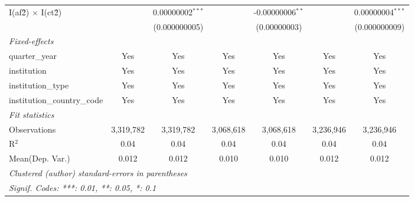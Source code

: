 \begin{tabular}{lcccccc}
   I(af\^2) $\times$ I(ct\^2)         &               & 0.00000002$^{***}$ &                & -0.00000006$^{**}$ &               & 0.00000004$^{***}$\\   
                                      &               & (0.000000005)      &                & (0.00000003)       &               & (0.000000009)\\   
   \midrule
   \emph{Fixed-effects}\\
   quarter\_year                      & Yes           & Yes                & Yes            & Yes                & Yes           & Yes\\  
   institution                        & Yes           & Yes                & Yes            & Yes                & Yes           & Yes\\  
   institution\_type                  & Yes           & Yes                & Yes            & Yes                & Yes           & Yes\\  
   institution\_country\_code         & Yes           & Yes                & Yes            & Yes                & Yes           & Yes\\  
   \midrule
   \emph{Fit statistics}\\
   Observations                       & 3,319,782     & 3,319,782          & 3,068,618      & 3,068,618          & 3,236,946     & 3,236,946\\  
   R$^2$                              & 0.04          & 0.04               & 0.04           & 0.04               & 0.04          & 0.04\\  
Mean(Dep. Var.) & 0.012 & 0.012 & 0.010 & 0.010 & 0.012 & 0.012 \\
   \midrule \midrule
   \multicolumn{7}{l}{\emph{Clustered (author) standard-errors in parentheses}}\\
   \multicolumn{7}{l}{\emph{Signif. Codes: ***: 0.01, **: 0.05, *: 0.1}}\\
\end{tabular}
\par\endgroup
